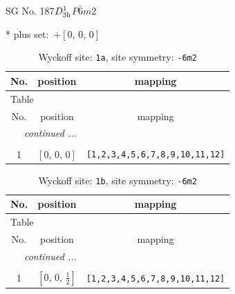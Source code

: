 \documentclass[fleqn,8pt]{jsarticle}
\begin{document}
\setcounter{MaxMatrixCols}{32}

\renewcommand{\tablename}{Table~}
\renewcommand{\figurename}{Figure~}
\begin{center}
\LARGE
SG No. 187\quad$D_{\rm 3h}^{1}$\quad$P\bar{6}m2$\quad[ hexagonal ]
\end{center}
* plus set:\,\,\,$+\left[ 0,\, 0,\, 0 \right]$
\renewcommand{\arraystretch}{1.2}
\begin{longtable}{ccc}
\caption{Wyckoff site: {\tt 1a}, site symmetry: {\tt -6m2}}
 \\
 \hline \hline
No. & position & mapping \\ \hline \endfirsthead

\multicolumn{2}{l}{\tablename\ \thetable{}} \\
 \hline \hline
No. & position & mapping \\ \hline \endhead

 \hline \hline
\multicolumn{2}{r}{\footnotesize\it continued ...} \\ \endfoot

 \hline \hline
\multicolumn{2}{r}{} \\ \endlastfoot

1 & $\left[ 0,\, 0,\, 0 \right]$ & {\tt [1,2,3,4,5,6,7,8,9,10,11,12]} \\
\end{longtable}
\renewcommand{\arraystretch}{1.2}
\begin{longtable}{ccc}
\caption{Wyckoff site: {\tt 1b}, site symmetry: {\tt -6m2}}
 \\
 \hline \hline
No. & position & mapping \\ \hline \endfirsthead

\multicolumn{2}{l}{\tablename\ \thetable{}} \\
 \hline \hline
No. & position & mapping \\ \hline \endhead

 \hline \hline
\multicolumn{2}{r}{\footnotesize\it continued ...} \\ \endfoot

 \hline \hline
\multicolumn{2}{r}{} \\ \endlastfoot

1 & $\left[ 0,\, 0,\, \frac{1}{2} \right]$ & {\tt [1,2,3,4,5,6,7,8,9,10,11,12]} \\
\end{longtable}
\renewcommand{\arraystretch}{1.2}
\end{document}

